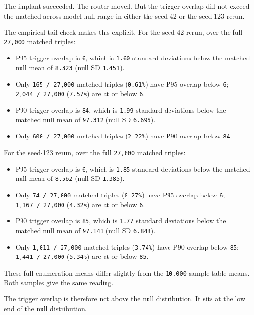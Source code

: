 \documentclass[
  11pt,
  a4paper,
]{article}
\providecommand{\tightlist}{%
  \setlength{\itemsep}{0pt}\setlength{\parskip}{0pt}}
\begin{document}
The implant succeeded. The router moved. But the trigger overlap did not
exceed the matched across-model null range in either the seed-42 or the
seed-123 rerun.

The empirical tail check makes this explicit. For the seed-42 rerun,
over the full \texttt{27,000} matched triples:

\begin{itemize}
\tightlist
\item
  P95 trigger overlap is \texttt{6}, which is \texttt{1.60} standard
  deviations below the matched null mean of \texttt{8.323} (null SD
  \texttt{1.451}).
\item
  Only \texttt{165\ /\ 27,000} matched triples (\texttt{0.61\%}) have
  P95 overlap below \texttt{6}; \texttt{2,044\ /\ 27,000}
  (\texttt{7.57\%}) are at or below \texttt{6}.
\item
  P90 trigger overlap is \texttt{84}, which is \texttt{1.99} standard
  deviations below the matched null mean of \texttt{97.312} (null SD
  \texttt{6.696}).
\item
  Only \texttt{600\ /\ 27,000} matched triples (\texttt{2.22\%}) have
  P90 overlap below \texttt{84}.
\end{itemize}

For the seed-123 rerun, over the full \texttt{27,000} matched triples:

\begin{itemize}
\tightlist
\item
  P95 trigger overlap is \texttt{6}, which is \texttt{1.85} standard
  deviations below the matched null mean of \texttt{8.562} (null SD
  \texttt{1.385}).
\item
  Only \texttt{74\ /\ 27,000} matched triples (\texttt{0.27\%}) have P95
  overlap below \texttt{6}; \texttt{1,167\ /\ 27,000} (\texttt{4.32\%})
  are at or below \texttt{6}.
\item
  P90 trigger overlap is \texttt{85}, which is \texttt{1.77} standard
  deviations below the matched null mean of \texttt{97.141} (null SD
  \texttt{6.848}).
\item
  Only \texttt{1,011\ /\ 27,000} matched triples (\texttt{3.74\%}) have
  P90 overlap below \texttt{85}; \texttt{1,441\ /\ 27,000}
  (\texttt{5.34\%}) are at or below \texttt{85}.
\end{itemize}

These full-enumeration means differ slightly from the
\texttt{10,000}-sample table means. Both samples give the same reading.

The trigger overlap is therefore not above the null distribution. It
sits at the low end of the null distribution.
\end{document}
